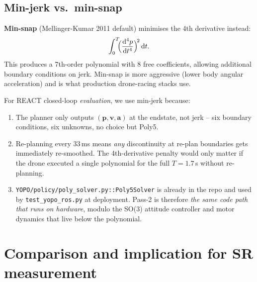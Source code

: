 \documentclass[11pt]{article}
\newcommand{\dt}{\,\mathrm{d}t}
\begin{document}
\subsection{Min-jerk vs.\ min-snap}

\textbf{Min-snap} (Mellinger-Kumar 2011 default) minimises the 4th derivative instead:
\begin{equation}
\int_0^T \!\!\Bigl(\frac{\mathrm{d}^4 p}{\mathrm{d}t^4}\Bigr)^{\!2}\dt.
\end{equation}
This produces a 7th-order polynomial with 8 free coefficients, allowing additional boundary conditions on jerk.  Min-snap is more aggressive (lower body angular acceleration) and is what production drone-racing stacks use.

For REACT closed-loop \emph{evaluation}, we use min-jerk because:
\begin{enumerate}
  \item The planner only outputs $(\bm{p}, \bm{v}, \bm{a})$ at the endstate, not jerk -- six boundary conditions, six unknowns, no choice but Poly5.
  \item Re-planning every 33\,ms means \emph{any} discontinuity at re-plan boundaries gets immediately re-smoothed.  The 4th-derivative penalty would only matter if the drone executed a single polynomial for the full $T = 1.7\,$s without re-planning.
  \item \texttt{YOPO/policy/poly\_solver.py::Poly5Solver} is already in the repo and used by \texttt{test\_yopo\_ros.py} at deployment.  Pass-2 is therefore \emph{the same code path that runs on hardware}, modulo the SO(3) attitude controller and motor dynamics that live below the polynomial.
\end{enumerate}

\section{Comparison and implication for SR measurement}
\end{document}
